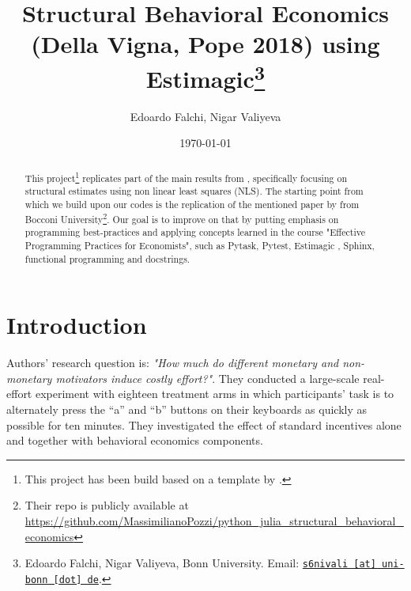 \documentclass[11pt, a4paper, leqno]{article}
\begin{document}
\title{Structural Behavioral Economics (Della Vigna, Pope 2018) using Estimagic\thanks{Edoardo Falchi, Nigar Valiyeva, Bonn University. Email: \href{mailto:s6nivali@uni-bonn.de}{\nolinkurl{s6nivali [at] uni-bonn [dot] de}}.}}

\author{Edoardo Falchi, Nigar Valiyeva}

\date{
    \today
}

\maketitle


\begin{abstract}
    This project\footnote{This project has been build based on a template by \cite{GaudeckerEconProjectTemplates}.} replicates part of the main results from \cite{dellavigna2018motivates}, specifically focusing on structural estimates using non linear least squares (NLS). The starting point from which we build upon our codes is the replication of the mentioned paper by \cite{PozziNunnari} from Bocconi University\footnote{Their repo is publicly available at \url{https://github.com/MassimilianoPozzi/python_julia_structural_behavioral_economics}}. Our goal is to improve on that by putting emphasis on programming best-practices and applying concepts learned in the course "Effective Programming Practices for Economists", such as Pytask, Pytest, Estimagic \citep{Gabler2021}, Sphinx, functional programming and docstrings.
\end{abstract}
\clearpage

\section{Introduction} %
\label{sec:introduction}
Authors' research question is: \emph{"How much do different monetary and non-monetary motivators induce costly effort?"}. They conducted a large-scale real-effort experiment with eighteen treatment arms in which participants' task is to alternately press the “a” and “b” buttons on their keyboards as quickly as possible for ten minutes. They investigated the effect of standard incentives alone and together with behavioral economics components.
\end{document}
